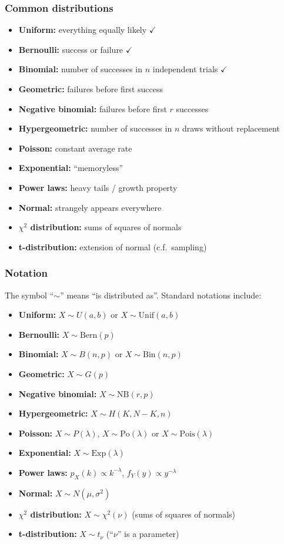 \documentclass[t,8pt]{beamer}
\begin{document}
\begin{frame}
	\frametitle{Common distributions}
	\begin{itemize}
		\item {\bf Uniform:} everything equally likely $\checkmark$
		\item {\bf Bernoulli:} success or failure $\checkmark$
		\item {\bf Binomial:} number of successes in $n$ independent trials $\checkmark$
		\item {\bf Geometric:} failures before first success
		\item {\bf Negative binomial:} failures before first $r$ successes
		\item {\bf Hypergeometric:} number of successes in $n$ draws without replacement
		\item {\bf Poisson:} constant average rate
		\item {\bf Exponential:} ``memoryless''
		\item {\bf Power laws:} heavy tails / growth property
		\item {\bf Normal:} strangely appears everywhere
		\item {\bf $\chi^2$ distribution:} sums of squares of normals
		\item {\bf t-distribution:} extension of normal (c.f.\ sampling)
	\end{itemize}
\end{frame}

\begin{frame}
	\frametitle{Notation}
	The symbol ``$\sim$'' means ``is distributed as''. Standard notations include:
	\begin{itemize}
		\item {\bf Uniform:} $X\sim U(a,b)$ or $X\sim \mathrm{Unif}(a,b)$
		\item {\bf Bernoulli:} $X\sim \mathrm{Bern}(p)$
		\item {\bf Binomial:} $X\sim B(n,p)$ or $X\sim \mathrm{Bin}(n,p)$
		\item {\bf Geometric:} $X\sim G(p)$
		\item {\bf Negative binomial:} $X\sim \mathrm{NB}(r,p)$
		\item {\bf Hypergeometric:} $X\sim H(K,N-K,n)$
		\item {\bf Poisson:} $X\sim P(\lambda)$, $X\sim \mathrm{Po}(\lambda)$ or $X\sim \mathrm{Pois}(\lambda)$
		\item {\bf Exponential:} $X\sim \mathrm{Exp}(\lambda)$
		\item {\bf Power laws:} $p_X(k)\propto k^{-\lambda}$, $f_Y(y)\propto y^{-\lambda}$
		\item {\bf Normal:} $X\sim N(\mu,\sigma^2)$
		\item {\bf $\chi^2$ distribution:} $X\sim\chi^2(\nu)$ (sums of squares of normals)
		\item {\bf t-distribution:} $X\sim t_{\nu}$ (``$\nu$'' is a parameter)
	\end{itemize}
\end{frame}
\end{document}
